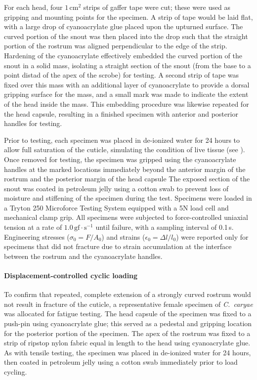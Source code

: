\documentclass[twocolumn, linenumbers, superscriptaddress, nofootinbib]{revtex4-1}
\begin{document}
				For each head, four $1\,\text{cm}^2$ strips of gaffer tape were cut; these were used as gripping and mounting points for the specimen.
				A strip of tape would be laid flat, with a large drop of cyanoacrylate glue placed upon the upturned surface.
				The curved portion of the snout was then placed into the drop such that the straight portion of the rostrum was aligned perpendicular to the edge of the strip.
				Hardening of the cyanoacrylate effectively embedded the curved portion of the snout in a solid mass, isolating a straight section of the snout (from the base to a point distad of the apex of the scrobe) for testing.
				A second strip of tape was fixed over this mass with an additional layer of cyanoacrylate to provide a dorsal gripping surface for the mass, and a small mark was made to indicate the extent of the head inside the mass.
				This embedding procedure was likewise repeated for the head capsule, resulting in a finished specimen with anterior and posterior handles for testing.
				
				Prior to testing, each specimen was placed in de-ionized water for 24 hours to allow full saturation of the cuticle, simulating the condition of live tissue (see \cite{Klocke2011}).
				Once removed for testing, the specimen was gripped using the cyanoacrylate handles at the marked locations immediately beyond the anterior margin of the rostrum and the posterior margin of the head capsule
				The exposed section of the snout was coated in petroleum jelly using a cotton swab to prevent loss of moisture and stiffening of the specimen during the test.
				Specimens were loaded in a Tryton 250 Microforce Testing System equipped with a 5N load cell and mechanical clamp grip.
				All specimens were subjected to force-controlled uniaxial tension at a rate of $1.0\,\text{gf}\cdot\text{s}^{-1}$ until failure, with a sampling interval of 0.1\,s.
				Engineering stresses ($\sigma_0=F/A_0$) and strains ($\epsilon_0=\Delta{l}/l_0$) were reported only for specimens that did not fracture due to strain accumulation at the interface between the rostrum and the cyanoacrylate handles.
				
			\paragraph*{Displacement-controlled cyclic loading}
				To confirm that repeated, complete extension of a strongly curved rostrum would not result in fracture of the cuticle, a representative female specimen of \textit{C.~caryae} was allocated for fatigue testing.
				The head capsule of the specimen was fixed to a push-pin using cyanoacrylate glue; this served as a pedestal and gripping location for the posterior portion of the specimen.
				The apex of the rostrum was fixed to a strip of ripstop nylon fabric equal in length to the head using cyanoacrylate glue.
				As with tensile testing, the specimen was placed in de-ionized water for 24 hours, then coated in petroleum jelly using a cotton swab immediately prior to load cycling.
				
\end{document}

